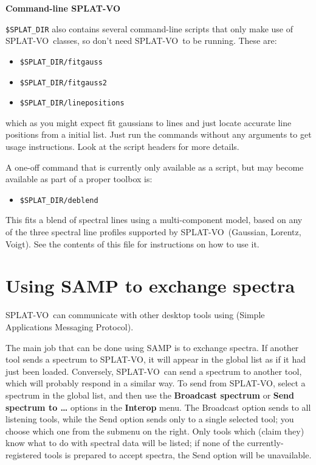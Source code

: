 \documentclass[twoside,11pt,nolof]{starlink}
\providecommand{\SPLAT}{\textsf{SPLAT-VO}}
\renewcommand{\menuitem}[1]{\textbf{#1}}
\providecommand{\hitext}[1]{\texttt{#1}}
\providecommand{\subheading}[1]{\textbf{\large{#1}}}
\begin{document}
\subheading{Command-line \SPLAT}

\hitext{\$SPLAT\_DIR} also contains several command-line scripts that
only make use of \SPLAT\ classes, so don't need \SPLAT\ to be running. These
are:
\begin{itemize}
\item \hitext{\$SPLAT\_DIR/fitgauss}
\item \hitext{\$SPLAT\_DIR/fitgauss2}
\item \hitext{\$SPLAT\_DIR/linepositions}
\end{itemize}
which as you might expect fit gaussians to lines and just locate
accurate line positions from a initial list. Just run the commands
without any arguments to get usage instructions. Look at the script
headers for more details.

A one-off command that is currently only available as a script, but may become
available as part of a proper toolbox is:
\begin{itemize}
\item \hitext{\$SPLAT\_DIR/deblend}
\end{itemize}
This fits a blend of spectral lines using a multi-component model, based on
any of the three spectral line profiles supported by \SPLAT\ (Gaussian,
Lorentz, Voigt). See the contents of this file for instructions on how to use
it.

\newpage
\section{Using SAMP to exchange spectra\label{interop}}

\SPLAT\ can communicate with other desktop tools using 
(Simple Applications Messaging Protocol).

The main job that can be done using SAMP is to exchange spectra.  If another
tool sends a spectrum to \SPLAT, it will appear in the global list as if it
had just been loaded.  Conversely, \SPLAT\ can send a spectrum to another
tool, which will probably respond in a similar way.  To send from \SPLAT,
select a spectrum in the global list, and then use the \menuitem{Broadcast
  spectrum} or \menuitem{Send spectrum to \ldots} options in the
\menuitem{Interop} menu.  The Broadcast option sends to all listening tools,
while the Send option sends only to a single selected tool; you choose which
one from the submenu on the right.  Only tools which (claim they) know what to
do with spectral data will be listed; if none of the currently-registered
tools is prepared to accept spectra, the Send option will be unavailable.
\end{document}
